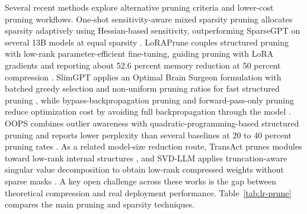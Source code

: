 Several recent methods explore alternative pruning criteria and lower-cost pruning workflows. One-shot sensitivity-aware mixed sparsity pruning allocates sparsity adaptively using Hessian-based sensitivity, outperforming SparseGPT on several 13B models at equal sparsity \cite{shao2024sensitivity}. LoRAPrune couples structured pruning with low-rank parameter-efficient fine-tuning, guiding pruning with LoRA gradients and reporting about 52.6 percent memory reduction at 50 percent compression \cite{zhang2024loraprune}. SlimGPT applies an Optimal Brain Surgeon formulation with batched greedy selection and non-uniform pruning ratios for fast structured pruning \cite{ling2024slimgpt}, while bypass-backpropagation pruning and forward-pass-only pruning reduce optimization cost by avoiding full backpropagation through the model \cite{kolawole2026bonsai,gao2025bypass}. OOPS combines outlier awareness with quadratic-programming-based structured pruning and reports lower perplexity than several baselines at 20 to 40 percent pruning rates \cite{survey2026oops}. As a related model-size reduction route, TransAct prunes modules toward low-rank internal structures \cite{shen2024transact}, and SVD-LLM applies truncation-aware singular value decomposition to obtain low-rank compressed weights without sparse masks \cite{wang2025svdllm}. A key open challenge across these works is the gap between theoretical compression and real deployment performance. Table~\ref{tab:lr-prune} compares the main pruning and sparsity techniques.

